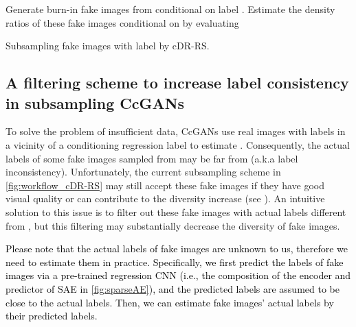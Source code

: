 \documentclass[final,12pt, 3p,times]{elsarticle}
\def\rev#1{\textcolor{black}{#1}}
\begin{document}
\begin{algorithm}[h]
	\footnotesize
	\SetAlgoLined
	Generate  burn-in fake images from  conditional on label .\;
	Estimate the density ratios of these  fake images conditional on  by evaluating \;
	\;
	\;
	\caption{Subsampling fake images with label  by cDR-RS.}
	\label{alg:cDR-RS}
\end{algorithm}


\subsection{A filtering scheme to increase label consistency in subsampling CcGANs}\label{sec:filtering_CcGAN}
To solve the problem of insufficient data, CcGANs \cite{ding2021ccgan, ding2020continuous} use real images with labels in a vicinity of a conditioning regression label  to estimate . Consequently, the actual labels of some fake images sampled from  may be far from  (a.k.a label inconsistency). Unfortunately, the current subsampling scheme in \cref{fig:workflow_cDR-RS} may still accept these fake images if they have good visual quality or can contribute to the diversity increase (see ). An intuitive solution to this issue is to filter out these fake images with actual labels different from , but this filtering may substantially decrease the diversity of fake images. 

\rev{Please note that the actual labels of fake images are unknown to us, therefore we need to estimate them in practice. Specifically, we first predict the labels of fake images via a pre-trained regression CNN (i.e., the composition of the encoder and predictor of SAE in \cref{fig:sparseAE}), and the predicted labels are assumed to be close to the actual labels. Then, we can estimate fake images' actual labels by their predicted labels.}
\end{document}
